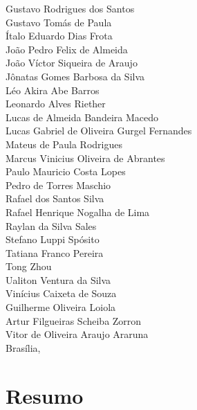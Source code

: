 \documentclass[12pt]{book}
\begin{document}
\begin{titlepage}
\begin{center}
	Gustavo Rodrigues dos Santos \\
	Gustavo Tomás de Paula\\
	Ítalo Eduardo Dias Frota\\
	João Pedro Felix de Almeida\\
	João Víctor Siqueira de Araujo\\
	Jônatas Gomes Barbosa da Silva\\
	Léo Akira Abe Barros\\
	Leonardo Alves Riether\\
	Lucas de Almeida Bandeira Macedo\\
	Lucas Gabriel de Oliveira Gurgel Fernandes \\
	Mateus de Paula Rodrigues\\
	Marcus Vinicius Oliveira de Abrantes\\
	Paulo Mauricio Costa Lopes\\
	Pedro de Torres Maschio\\
	Rafael dos Santos Silva\\
	Rafael Henrique Nogalha de Lima\\
	Raylan da Silva Sales\\
	Stefano Luppi Spósito\\
	Tatiana Franco Pereira\\
	Tong Zhou\\
	Ualiton Ventura da Silva\\
	Vinícius Caixeta de Souza\\
	Guilherme Oliveira Loiola\\
	Artur Filgueiras Scheiba Zorron\\
	Vitor de Oliveira Araujo Araruna \\
	\vspace{1.5cm}
	{\large Brasília, \DTMnow}
\end{center}
\end{titlepage}
    \listoftodos
	\printnoidxglossary
	\tableofcontents
	\listoffigures
	\listoftables
	\clearpage
{}

\pagestyle{fancy}

	\chapter*{Resumo}
\end{document}
